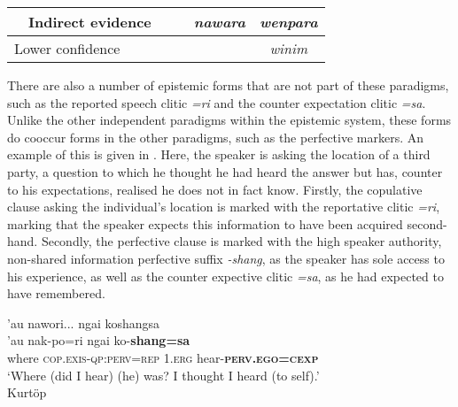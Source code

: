\begin{table}
{\begin{tabular}{llll|c|c|c|c|}
            \multicolumn{1}{|l|}{}                                 & \multicolumn{3}{l|}{Indirect evidence}                & \cellcolor[HTML]{C0C0C0}                       & \cellcolor[HTML]{C0C0C0} & \textit{nawara}          & \textit{wenpara}                                                                                   \\ \hline
            \multicolumn{4}{|l|}{Lower confidence}                 & \cellcolor[HTML]{C0C0C0}                              & \cellcolor[HTML]{C0C0C0}                       & \cellcolor[HTML]{C0C0C0} & \textit{winim}                                                                                                                \\ \hline
        \end{tabular}}
\end{table}

There are also a number of epistemic forms that are not part of these paradigms, such as the reported speech clitic \textit{=ri} and the counter expectation clitic \textit{=sa}. Unlike the other independent paradigms within the epistemic system, these forms do cooccur forms in the other paradigms, such as the perfective markers. An example of this is given in . Here, the speaker is asking the location of a third party, a question to which he thought he had heard the answer but has, counter to his expectations, realised he does not in fact know. Firstly, the copulative clause asking the individual's location is marked with the reportative clitic \textit{=ri}, marking that the speaker expects this information to have been acquired second-hand. Secondly, the perfective clause is marked with the high speaker authority, non-shared information perfective suffix \textit{-shang}, as the speaker has sole access to his experience, as well as the counter expective clitic \textit{=sa}, as he had expected to have remembered.

\begin{exe}
    \ex\label{e:Discussion:KurtopCExp}
    \glll 'au nawori... ngai koshangsa \\
    'au nak-po=ri ngai ko-\textbf{shang=sa} \\
    where \textsc{cop.exis-qp:perv=rep} \textsc{1.erg} hear-\textsc{\textbf{perv.ego=cexp}} \\
    \glt `Where (did I hear) (he) was? I thought I heard (to self).' \\
    Kurtöp \cite[East Bodish: Bhutan,][126]{Hyslop2014}

\end{exe}

